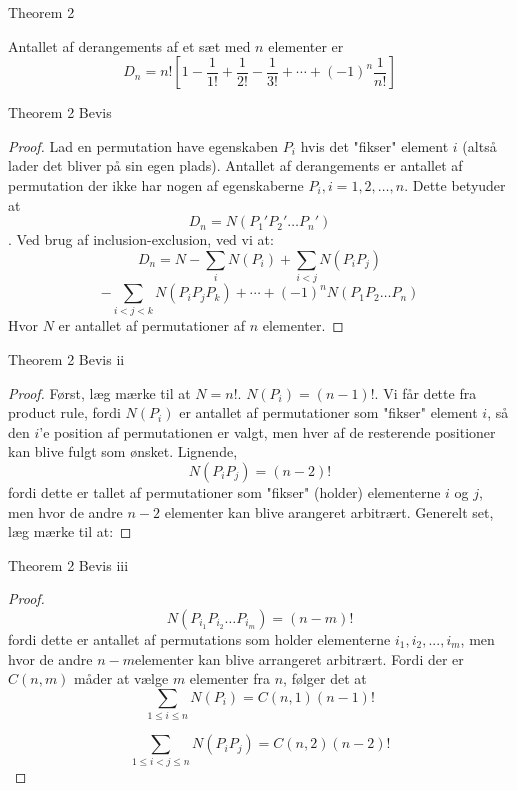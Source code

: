 \documentclass{beamer}
\begin{document}
\begin{frame}{Theorem 2}
\begin{theorem}
    
       Antallet af derangements af et sæt med $n$ elementer er 
       $$D_n = n!\left [1 - \frac{1}{1!}  + \frac{1}{2!} - \frac{1}{3!} + \cdots + (-1)^n \frac{1}{n!}\right ]$$
\end{theorem}
\end{frame}


\begin{frame}{Theorem 2 Bevis}
   \begin{proof}
       Lad en permutation have egenskaben $P_i$ hvis det "fikser" element $i$ (altså lader det bliver på sin egen plads). Antallet af derangements er antallet af permutation der ikke har nogen af egenskaberne $P_i, i = 1, 2, \ldots, n$. Dette betyuder at $$D_n = N(P_1'P_2'\ldots P_n')$$.
       Ved brug af inclusion-exclusion, ved vi at: 
       $$D_n = N - \sum_i N(P_i) + \sum_{i < j} N(P_iP_j)$$
       $$- \sum_{i<j<k} N(P_iP_jP_k) + \cdots + (-1)^n N(P_1P_2 \ldots P_n)$$
       Hvor $N$ er antallet af permutationer af $n$ elementer. 
   \end{proof} 
\end{frame}

\begin{frame}{Theorem 2 Bevis ii}
   \begin{proof}
       Først, læg mærke til at $N = n!$. $N(P_i) = (n-1)!$. Vi får dette fra product rule, fordi $N(P_i)$ er antallet af permutationer som "fikser" element $i$, så den $i$'e position af permutationen er valgt, men hver af de resterende positioner kan blive fulgt som ønsket. Lignende, $$N(P_iP_j) = (n-2)!$$ fordi dette er tallet af permutationer som "fikser" (holder) elementerne $i$ og $j$, men hvor de andre $n-2$ elementer kan blive arangeret arbitrært. Generelt set, læg mærke til at: 
   \end{proof} 
\end{frame}

\begin{frame}{Theorem 2 Bevis iii}
   \begin{proof}
       $$N(P_{i_1}P_{i_2} \ldots P_{i_m}) = (n-m)!$$ fordi dette er antallet af permutations som holder elementerne $i_1, i_2, ..., i_m$, men hvor de andre $n-m$elementer kan blive arrangeret arbitrært. Fordi der er $C(n,m)$ måder at vælge $m$ elementer fra $n$, følger det at $$\sum_{1 \leq i \leq n} N(P_i) = C(n,1)(n-1)!$$
       
       $$\sum_{1 \leq i < j \leq n}N(P_iP_j) = C(n,2)(n-2)!$$
   \end{proof} 
\end{frame}
\end{document}
